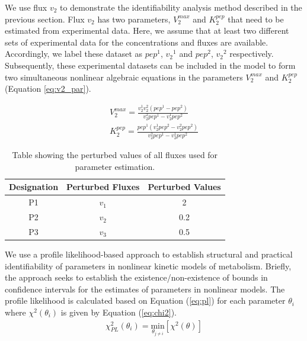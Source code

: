 \documentclass[10pt]{article}
\begin{document}
	We use flux $v_2$ to demonstrate the identifiability analysis method described in the previous section. Flux $v_2$ has two parameters, $V_2^{max}$ and $K_2^{pep}$ that need to be estimated from experimental data. Here, we assume that at least two different sets of experimental data for the concentrations and fluxes are available. Accordingly, we label these dataset as ${pep}^1$, ${v_2}^1$ and ${pep}^2$, ${v_2}^2$ respectively. Subsequently, these experimental datasets can be included in the model to form two simultaneous nonlinear algebraic equations in the parameters $V_2^{max}$ and $K_2^{pep}$ (Equation \ref{eq:v2_par}).
	
	\begin{subequations}\label{eq:v2_par}
		\begin{align}		
		V_2^{max} = \frac{v_2^1v_2^2(pep^1-pep^2)}{v_2^2pep^1-v_2^1pep^2}\\
		K_2^{pep} = \frac{pep^1(v_2^1pep^2-v_2^2pep^2)}{v_2^2pep^1-v_2^1pep^2}
		\end{align}
	\end{subequations}
	
	\begin{table}[!tbhp]
		\caption{Table showing the perturbed values of all fluxes used for parameter estimation.}
		\begin{center}				
			\begin{tabular}{ccc}
				Designation & Perturbed Fluxes & Perturbed Values\\
				\hline
				P1 & $v_1$ & 2\\
				P2 & $v_2$ & 0.2\\
				P3 & $v_3$ & 0.5
			\end{tabular}
		\end{center}	
		\label{tab:pval}
	\end{table}
	
	 We use a profile likelihood-based approach \parencite{Raue2009a} to establish structural and practical identifiability of parameters in nonlinear kinetic models of metabolism. Briefly, the approach seeks to establish the existence/non-existence of bounds in confidence intervals for the estimates of parameters in nonlinear models. The profile likelihood is calculated based on Equation (\ref{eq:pl}) for each parameter $\theta_i$ where $\chi^2(\theta_i)$ is given by Equation (\ref{eq:chi2}).
	 \begin{align}\label{eq:pl}
	 \chi_{PL}^2(\theta_i) = \underset{\theta_{j\ne i}}{\mathrm{min}} \left[\chi^2(\theta)\right]
	 \end{align}
	 
\end{document}
